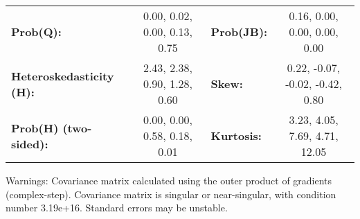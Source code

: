 \begin{center}
\begin{tabular}{lclc}
\textbf{Prob(Q):}                &    0.00, 0.02, 0.00, 0.13, 0.75    & \textbf{  Prob(JB):          } &     0.16, 0.00, 0.00, 0.00, 0.00     \\
\textbf{Heteroskedasticity (H):} &    2.43, 2.38, 0.90, 1.28, 0.60    & \textbf{  Skew:              } &   0.22, -0.07, -0.02, -0.42, 0.80    \\
\textbf{Prob(H) (two-sided):}    &    0.00, 0.00, 0.58, 0.18, 0.01    & \textbf{  Kurtosis:          } &    3.23, 4.05, 7.69, 4.71, 12.05     \\
\bottomrule
\end{tabular}
\end{center}

Warnings: \newline
 [1] Covariance matrix calculated using the outer product of gradients (complex-step). \newline
 [2] Covariance matrix is singular or near-singular, with condition number 3.19e+16. Standard errors may be unstable.